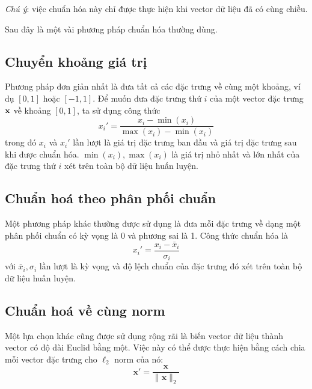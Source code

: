 \textit{Chú ý}: việc chuẩn hóa này chỉ được thực hiện khi vector dữ liệu đã có cùng chiều.

Sau đây là một vài phương pháp chuẩn hóa thường dùng.

\subsection{Chuyển khoảng giá trị}
Phương pháp đơn giản nhất là đưa tất cả các đặc trưng về cùng một khoảng, ví dụ $[0, 1]$ hoặc $[-1, 1]$. Để muốn đưa đặc trưng thứ
$i$ của một vector đặc trưng $\mathbf{x}$ về khoảng $[0, 1]$, ta sử dụng công thức
\begin{equation*}
x_i' = \frac{x_i - \min(x_i)}{\max(x_i) - \min(x_i)}
\end{equation*}
trong đó $x_i$ và $x_i'$ lần lượt là giá trị đặc trưng ban đầu và giá trị đặc
trưng sau khi được chuẩn hóa. $\min(x_i), \max(x_i)$ là giá trị nhỏ nhất và lớn
nhất của đặc trưng thứ $i$ xét trên toàn bộ dữ liệu huấn luyện.


\subsection{Chuẩn hoá theo phân phối chuẩn}
Một phương pháp khác thường được sử dụng là đưa mỗi đặc trưng về dạng một
phân phối chuẩn có kỳ vọng là 0 và phương sai là 1. Công thức chuẩn hóa
là
\begin{equation*}
x_i' = \frac{x_i - \bar{x}_i}{\sigma_i}
\end{equation*}
với $\bar{x}_i, \sigma_i$ lần lượt là kỳ vọng và độ lệch chuẩn của đặc trưng đó
xét trên toàn bộ dữ liệu huấn luyện.

\subsection{Chuẩn hoá về cùng norm}
Một lựa chọn khác cũng được sử dụng rộng rãi là biến vector dữ liệu thành vector
có độ dài Euclid bằng một. Việc này có thể được thực hiện bằng cách chia mỗi
vector đặc trưng cho $\ell_2$ norm của nó:
\begin{equation*}
\mathbf{x}' = \frac{\mathbf{x}}{\|\mathbf{x}\|_2}
\end{equation*}



